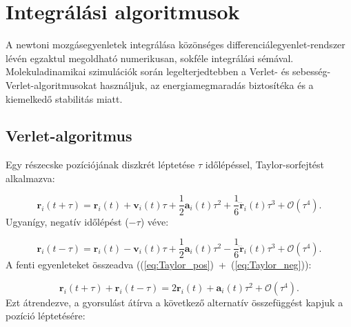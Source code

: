 \documentclass[12pt]{article}
\theoremstyle{plain}
\begin{document}
\section{Integrálási algoritmusok}

A newtoni mozgásegyenletek integrálása közönséges differenciálegyenlet-rendszer lévén egzaktul megoldható numerikusan, sokféle integrálási sémával. Molekuladinamikai szimulációk során legelterjedtebben a Verlet- és sebesség-Verlet-algoritmusokat használjuk, az energiamegmaradás biztosítéka és a kiemelkedő stabilitás miatt.


\subsection{Verlet-algoritmus}

Egy részecske pozíciójának diszkrét léptetése $\tau$ időlépéssel, Taylor-sorfejtést alkalmazva:

\begin{equation}
	\mathbf{r}_i (t+\tau) = \mathbf{r}_i(t) + \mathbf{v}_i(t) \tau + \frac{1}{2} \mathbf{a}_i(t) \tau^2 + \frac{1}{6} \dddot{\mathbf{r}}_i (t) \tau^3 + \mathcal{O}(\tau^4).
	\label{eq:Taylor_pos}
\end{equation}
Ugyanígy, negatív időlépést ($-\tau$) véve:

\begin{equation}
	\mathbf{r}_i (t-\tau) = \mathbf{r}_i(t) - \mathbf{v}_i(t) \tau + \frac{1}{2} \mathbf{a}_i(t) \tau^2 - \frac{1}{6} \dddot{\mathbf{r}}_i (t) \tau^3 + \mathcal{O}(\tau^4).
	\label{eq:Taylor_neg}
\end{equation}
A fenti egyenleteket összeadva ((\ref{eq:Taylor_pos})~+~(\ref{eq:Taylor_neg})):

\begin{equation}
	\mathbf{r}_i (t+\tau) + \mathbf{r}_i (t-\tau) = 2 \mathbf{r}_i(t) + \mathbf{a}_i(t) \tau^2 + \mathcal{O}(\tau^4).
\end{equation}
Ezt átrendezve, a gyorsulást átírva a következő alternatív összefüggést kapjuk a pozíció léptetésére:
\end{document}
